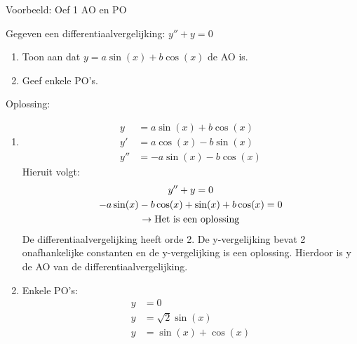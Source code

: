 \documentclass[12pt]{report}
\newcommand{\example}[2]{
    \hrulefill
    
    Voorbeeld: #1
    
    #2
    
    \hrulefill
}
\begin{document}
\example{Oef 1 AO en PO}{Gegeven een differentiaalvergelijking: $y'' + y = 0$
\begin{enumerate}
\item Toon aan dat $y = a\sin(x) + b\cos(x)$ de AO is.
\item Geef enkele PO's.
\end{enumerate}
Oplossing:
\begin{enumerate}
\item 
\begin{equation*}
\begin{split}
    y & = a\sin(x) + b\cos(x) \\
    y' & = a\cos(x) - b\sin(x) \\
    y'' & = -a\sin(x) - b\cos(x) 
\end{split}
\end{equation*}
Hieruit volgt:
\begin{gather*}
    y'' + y  = 0 \\
    -a\sin(x) - b\cos(x) + \sin(x) + b\cos(x)  = 0  \\
    \rightarrow \hbox{Het is een oplossing}
\end{gather*}
De differentiaalvergelijking heeft orde 2. De y-vergelijking bevat 2 onafhankelijke constanten en de y-vergelijking is een oplossing. Hierdoor is y de AO van de differentiaalvergelijking.
\item Enkele PO's:
\begin{equation*}
\begin{split}
y & = 0\\
y & = \sqrt{2}\sin(x) \\
y & = \sin(x) + \cos(x)
\end{split}
\end{equation*}
\end{enumerate}
}
\end{document}
